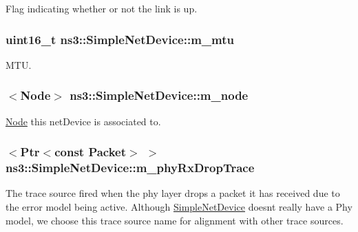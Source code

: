 Flag indicating whether or not the link is up. 

\subsubsection[{\texorpdfstring{m\+\_\+mtu}{m_mtu}}]{\setlength{\rightskip}{0pt plus 5cm}uint16\+\_\+t ns3\+::\+Simple\+Net\+Device\+::m\+\_\+mtu\hspace{0.3cm}{\ttfamily [private]}}\hypertarget{classns3_1_1SimpleNetDevice_aab2aea73b33a02c23f8d417214a0d2a0}{}\label{classns3_1_1SimpleNetDevice_aab2aea73b33a02c23f8d417214a0d2a0}


M\+TU. 

\subsubsection[{\texorpdfstring{m\+\_\+node}{m_node}}]{$<${\bf Node}$>$ ns3\+::\+Simple\+Net\+Device\+::m\+\_\+node\hspace{0.3cm}{\ttfamily [private]}}\hypertarget{classns3_1_1SimpleNetDevice_abf59768bbf6b40baef7d8dd6ed6028be}{}\label{classns3_1_1SimpleNetDevice_abf59768bbf6b40baef7d8dd6ed6028be}


\hyperlink{classns3_1_1Node}{Node} this net\+Device is associated to. 

\subsubsection[{\texorpdfstring{m\+\_\+phy\+Rx\+Drop\+Trace}{m_phyRxDropTrace}}]{$<${\bf Ptr}$<$const {\bf Packet}$>$ $>$ ns3\+::\+Simple\+Net\+Device\+::m\+\_\+phy\+Rx\+Drop\+Trace\hspace{0.3cm}{\ttfamily [private]}}\hypertarget{classns3_1_1SimpleNetDevice_a1ff8de95910e13b1fe6c9b5c07a6f721}{}\label{classns3_1_1SimpleNetDevice_a1ff8de95910e13b1fe6c9b5c07a6f721}
The trace source fired when the phy layer drops a packet it has received due to the error model being active. Although \hyperlink{classns3_1_1SimpleNetDevice}{Simple\+Net\+Device} doesn\textquotesingle{}t really have a Phy model, we choose this trace source name for alignment with other trace sources.


